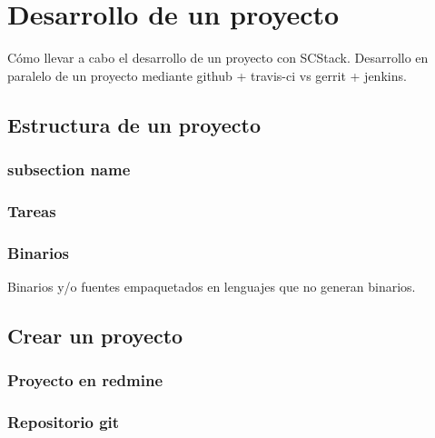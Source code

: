 \chapter{Desarrollo de un proyecto}
\label{chap:desarrollo}

\par Cómo llevar a cabo el desarrollo de un proyecto con SCStack. Desarrollo en paralelo de un proyecto mediante github + travis-ci vs gerrit + jenkins.

\section{Estructura de un proyecto}
\label{sec:estructura}


\subsection{subsection name}
\label{sub:codigo-fuente}


\subsection{Tareas}
\label{sub:tareas}


\subsection{Binarios}
\label{sub:binarios}

Binarios y/o fuentes empaquetados en lenguajes que no generan binarios.


\section{Crear un proyecto}
\label{sec:crear-pryecto}

\subsection{Proyecto en redmine}
\label{sub:proyeto-redmine}


\subsection{Repositorio git}
\label{sub:repo-git}

